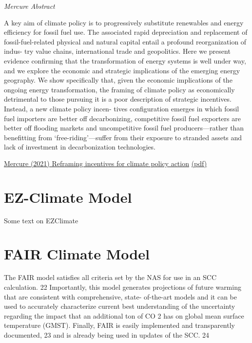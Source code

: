 \documentclass[
]{book}
\begin{document}
\emph{Mercure Abstract}

A key aim of climate policy is to progressively substitute renewables and energy efficiency for fossil fuel use. The associated
rapid depreciation and replacement of fossil-fuel-related physical and natural capital entail a profound reorganization of indus-
try value chains, international trade and geopolitics. Here we present evidence confirming that the transformation of energy
systems is well under way, and we explore the economic and strategic implications of the emerging energy geography. We
show specifically that, given the economic implications of the ongoing energy transformation, the framing of climate policy as
economically detrimental to those pursuing it is a poor description of strategic incentives. Instead, a new climate policy incen-
tives configuration emerges in which fossil fuel importers are better off decarbonizing, competitive fossil fuel exporters are
better off flooding markets and uncompetitive fossil fuel producers---rather than benefitting from `free-riding'---suffer from
their exposure to stranded assets and lack of investment in decarbonization technologies.

\href{https://www.nature.com/articles/s41560-021-00934-2}{Mercure (2021) Reframing incentives for climate policy action}
\href{pdf/Mercure_2021_Reframing_incentives_for_Climate_Policy_Action.pdf}{(pdf)}

\hypertarget{ez-climate-model}{%
\section{EZ-Climate Model}\label{ez-climate-model}}

Some text on EZClimate

\hypertarget{fair-climate-model}{%
\section{FAIR Climate Model}\label{fair-climate-model}}

The FAIR model satisfies all
criteria set by the NAS for use in an SCC calculation. 22 Importantly, this model
generates projections of future warming that are consistent with comprehensive, state-
of-the-art models and it can be used to accurately characterize current best
understanding of the uncertainty regarding the impact that an additional ton of CO 2
has on global mean surface temperature (GMST). Finally, FAIR is easily implemented
and transparently documented, 23 and is already being used in updates of the SCC. 24
\end{document}

